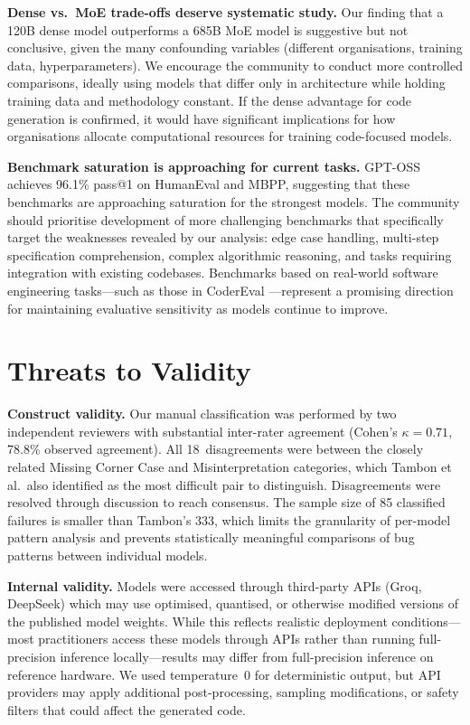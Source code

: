 \documentclass[smallextended]{svjour3}
\begin{document}
\textbf{Dense vs.\ MoE trade-offs deserve systematic study.} Our finding that a 120B dense model outperforms a 685B MoE model is suggestive but not conclusive, given the many confounding variables (different organisations, training data, hyperparameters). We encourage the community to conduct more controlled comparisons, ideally using models that differ only in architecture while holding training data and methodology constant. If the dense advantage for code generation is confirmed, it would have significant implications for how organisations allocate computational resources for training code-focused models.

\textbf{Benchmark saturation is approaching for current tasks.} GPT-OSS achieves 96.1\% pass@1 on HumanEval and MBPP, suggesting that these benchmarks are approaching saturation for the strongest models. The community should prioritise development of more challenging benchmarks that specifically target the weaknesses revealed by our analysis: edge case handling, multi-step specification comprehension, complex algorithmic reasoning, and tasks requiring integration with existing codebases. Benchmarks based on real-world software engineering tasks---such as those in CoderEval \citep{yu2023codereval}---represent a promising direction for maintaining evaluative sensitivity as models continue to improve.

\section{Threats to Validity}
\label{sec:threats}

\textbf{Construct validity.} Our manual classification was performed by two independent reviewers with substantial inter-rater agreement (Cohen's $\kappa = 0.71$, 78.8\% observed agreement). All 18~disagreements were between the closely related Missing Corner Case and Misinterpretation categories, which Tambon et al.\ also identified as the most difficult pair to distinguish. Disagreements were resolved through discussion to reach consensus. The sample size of 85 classified failures is smaller than Tambon's 333, which limits the granularity of per-model pattern analysis and prevents statistically meaningful comparisons of bug patterns between individual models.

\textbf{Internal validity.} Models were accessed through third-party APIs (Groq, DeepSeek) which may use optimised, quantised, or otherwise modified versions of the published model weights. While this reflects realistic deployment conditions---most practitioners access these models through APIs rather than running full-precision inference locally---results may differ from full-precision inference on reference hardware. We used temperature~0 for deterministic output, but API providers may apply additional post-processing, sampling modifications, or safety filters that could affect the generated code.
\end{document}
